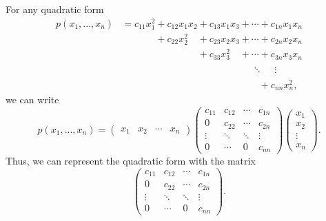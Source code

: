 \documentclass{ximera}
\begin{document}
For any quadratic form \begin{align*}
p(x_1,...,x_n) &= c_{11}x_1^2+c_{12}x_1x_2+c_{13}x_1x_3 + \cdots + c_{1n}x_1x_n\\
&\phantom{= c_{11}x_1^2}+c_{22}x_2^2\phantom{x_2}+c_{23}x_2x_3 + \cdots + c_{2n}x_2x_n\\
&\phantom{= c_{11}x_1^2+c_{12}x_1x_2}+c_{33}x_3^2\phantom{x_3} + \cdots + c_{3n}x_3x_n\\
&\phantom{= c_{11}x_1^2+c_{12}x_1x_2+c_{13}x_1x_3 +} \ddots \phantom{+} \vdots\\
&\phantom{= c_{11}x_1^2+c_{12}x_1x_2+c_{13}x_1x_3 + \cdots }+ c_{nn}x_n^2,
\end{align*}
we can write 
\[
p(x_1,...,x_n) = \begin{pmatrix} x_1 & x_2 & \cdots & x_n \end{pmatrix}
\begin{pmatrix}
c_{11} & c_{12} & \cdots & c_{1n}\\
0 & c_{22} & \cdots & c_{2n}\\
\vdots & \ddots & \ddots & \vdots\\
0 & \cdots & 0 & c_{nn}
\end{pmatrix}
\begin{pmatrix} x_1 \\ x_2 \\ \vdots \\ x_n \end{pmatrix}.
\]
Thus, we can represent the quadratic form with the matrix
\[
\begin{pmatrix}
c_{11} & c_{12} & \cdots & c_{1n}\\
0 & c_{22} & \cdots & c_{2n}\\
\vdots & \ddots & \ddots & \vdots\\
0 & \cdots & 0 & c_{nn}
\end{pmatrix}.
\]
\end{document}

